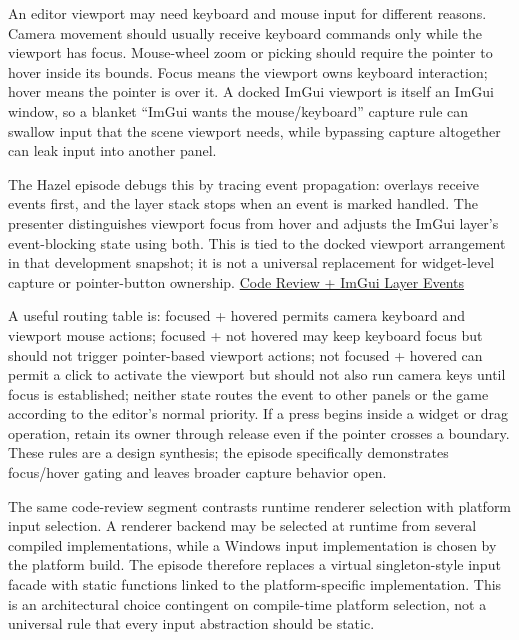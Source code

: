 \hypertarget{06-engine-ii-ch032-a-docked-viewport-needs-separate-focus-and-hover-decisions}{}

An editor viewport may need keyboard and mouse input for different reasons. Camera movement should usually receive keyboard commands only while the viewport has focus. Mouse-wheel zoom or picking should require the pointer to hover inside its bounds. Focus means the viewport owns keyboard interaction; hover means the pointer is over it. A docked ImGui viewport is itself an ImGui window, so a blanket ``ImGui wants the mouse/keyboard'' capture rule can swallow input that the scene viewport needs, while bypassing capture altogether can leak input into another panel.

The Hazel episode debugs this by tracing event propagation: overlays receive events first, and the layer stack stops when an event is marked handled. The presenter distinguishes viewport focus from hover and adjusts the ImGui layer's event-blocking state using both. This is tied to the docked viewport arrangement in that development snapshot; it is not a universal replacement for widget-level capture or pointer-button ownership. \href{https://www.youtube.com/watch?v=ETIhjdVBH-8}{Code Review + ImGui Layer Events}

A useful routing table is: focused + hovered permits camera keyboard and viewport mouse actions; focused + not hovered may keep keyboard focus but should not trigger pointer-based viewport actions; not focused + hovered can permit a click to activate the viewport but should not also run camera keys until focus is established; neither state routes the event to other panels or the game according to the editor's normal priority. If a press begins inside a widget or drag operation, retain its owner through release even if the pointer crosses a boundary. These rules are a design synthesis; the episode specifically demonstrates focus/hover gating and leaves broader capture behavior open.

The same code-review segment contrasts runtime renderer selection with platform input selection. A renderer backend may be selected at runtime from several compiled implementations, while a Windows input implementation is chosen by the platform build. The episode therefore replaces a virtual singleton-style input facade with static functions linked to the platform-specific implementation. This is an architectural choice contingent on compile-time platform selection, not a universal rule that every input abstraction should be static.


